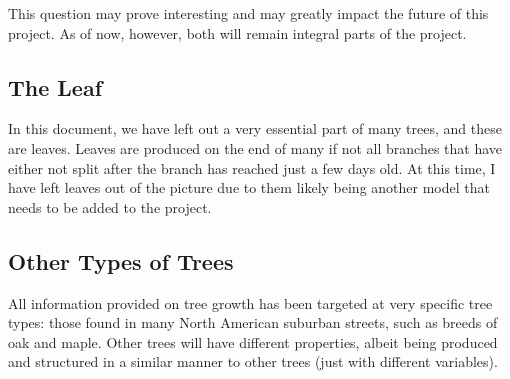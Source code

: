This question may prove interesting and may greatly impact the future of this project. As of now, however, both will remain integral parts of the project.

\subsection{The Leaf}

In this document, we have left out a very essential part of many trees, and these are leaves. Leaves are produced on the end of many if not all branches that have either not split after the branch has reached just a few days old. At this time, I have left leaves out of the picture due to them likely being another model that needs to be added to the project.

\subsection{Other Types of Trees}

All information provided on tree growth has been targeted at very specific tree types: those found in many North American suburban streets, such as breeds of oak and maple. Other trees will have different properties, albeit being produced and structured in a similar manner to other trees (just with different variables). 
